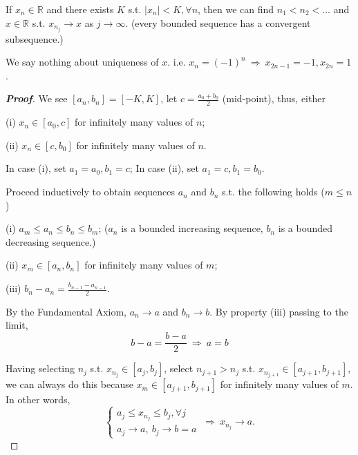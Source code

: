 \begin{theorem}\label{thm:bolzano_weierstrass_r}
If $x_n\in\mathbb{R}$ and there exists $K$ s.t. $|x_n|<K,\forall n$, then we can find $n_1<n_2<\dots$ and $x\in\mathbb{R}$ s.t. $x_{n_j}\to x$ as $j\to \infty$. (every bounded sequence has a convergent subsequence.)
\end{theorem}

\begin{remark}
We say nothing about uniqueness of $x$. i.e. $x_n=(-1)^n\ \Rightarrow \ x_{2n-1}=-1,x_{2n}=1$.
\end{remark}

\begin{proof}[{\bf Proof}]
We see $[a_n,b_n] = [-K,K]$, let $c=\frac{a_0+b_0}{2}$ (mid-point), thus, either
\ben
\item [(i)] $x_n\in[a_0,c]$ for infinitely many values of $n$;
\item [(ii)] $x_n\in[c,b_0]$ for infinitely many values of $n$.
\een

In case (i), set $a_1=a_0, b_1=c$; In case (ii), set $a_1=c,b_1=b_0$. 

Proceed inductively to obtain sequences $a_n$ and $b_n$ s.t. the following holds ($m\leq n$)

\ben
\item [(i)] $a_m\leq a_n\leq b_n\leq b_m$; ($a_n$ is a bounded increasing sequence, $b_n$ is a bounded decreasing sequence.)
\item [(ii)] $x_m\in[a_n,b_n]$ for infinitely many values of $m$;
\item [(iii)] $b_n-a_n=\frac{b_{n-1}-a_{n-1}}{2}$.
\een

By the Fundamental Axiom, $a_n\to a$ and $b_n\to b$. By property (iii) passing to the limit,
\begin{equation*}
b-a = \frac{b-a}{2}\ \Rightarrow \ a=b
\end{equation*}

Having selecting $n_j$ s.t. $x_{n_j}\in[a_j,b_j]$, select $n_{j+1}>n_j$ s.t. $x_{n_{j+1}}\in[a_{j+1},b_{j+1}]$, we can always do this because $x_m\in[a_{j+1},b_{j+1}]$ for infinitely many values of $m$. In other words, 
\begin{equation*}
\left\{\begin{array}{c}
a_j\leq x_{n_j} \leq b_j, \forall j\\
a_j\to a,\ b_j\to b=a
\end{array}\right.\ \Rightarrow \ x_{n_j}\to a.
\end{equation*}
\end{proof}

